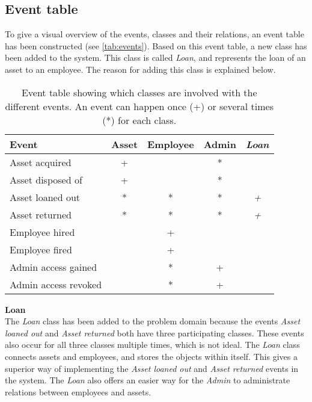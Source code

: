 \subsection{Event table}\label{ssc:eventtable}
To give a visual overview of the events, classes and their relations, an event table has been constructed (see \autoref{tab:events}).
Based on this event table, a new class has been added to the system. This class is called \textit{Loan}, and represents the loan of an asset to an employee. The reason for adding this class is explained below.

\begin{table}[H]
\centering
    \begin{tabular}{|l||c|c|c||c|}
        \hline
        \textbf{Event} & \textbf{Asset} & \textbf{Employee} & \textbf{Admin} & \textit{\textbf{Loan}} \\
        \hline
        \hline
        Asset acquired & + & & * & \\
        \hline
        Asset disposed of & + & & * & \\
        \hline
        Asset loaned out & * & * & * & \textit{+} \\
        \hline
        Asset returned & * & * & * & \textit{+} \\
        \hline
        Employee hired & & + & & \\
        \hline
        Employee fired & & + & & \\
        \hline
        Admin access gained & & * & + & \\
        \hline
        Admin access revoked & & * & + & \\
        \hline
    \end{tabular}
\caption{Event table showing which classes are involved with the different events. An event can happen once (+) or several times (*) for each class.}\label{tab:events}
\end{table}
\par
\textbf{Loan}\\
The \textit{Loan} class has been added to the problem domain because the events \textit{Asset loaned out} and \textit{Asset returned} both have three participating classes. These events also occur for all three classes multiple times, which is not ideal. The \textit{Loan} class connects assets and employees, and stores the objects within itself. This gives a superior way of implementing the \textit{Asset loaned out} and \textit{Asset returned} events in the system. The \textit{Loan} also offers an easier way for the \textit{Admin} to administrate relations between employees and assets.

